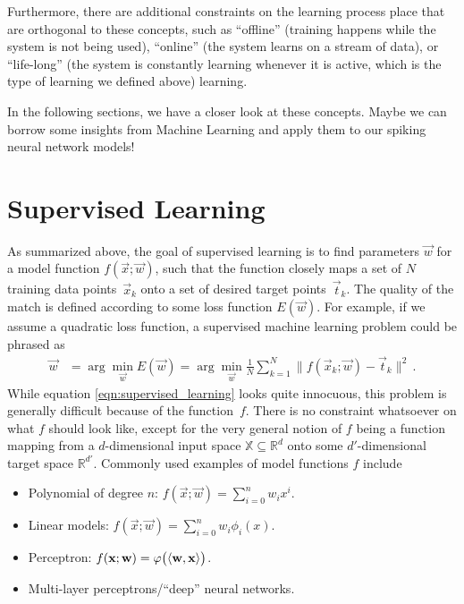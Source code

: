 \documentclass[10pt,letterpaper,oneside]{article}
\begin{document}
Furthermore, there are additional constraints on the learning process place that are orthogonal to these concepts, such as \enquote{offline} (training happens while the system is not being used), \enquote{online} (the system learns on a stream of data), or \enquote{life-long} (the system is constantly learning whenever it is active, which is the type of learning we defined above) learning.

In the following sections, we have a closer look at these concepts. Maybe we can borrow some insights from Machine Learning and apply them to our spiking neural network models!

\section{Supervised Learning}

As summarized above, the goal of supervised learning is to find parameters $\vec w$ for a model function $f(\vec x; \vec w)$, such that the function closely maps a set of $N$ training data points~$\vec x_k$ onto a set of desired target points~$\vec t_k$. The quality of the match is defined according to some loss function $E(\vec w)$. For example, if we assume a quadratic loss function, a supervised machine learning problem could be phrased as
\begin{align}
	\vec w &= \arg \min_{\vec w} E(\vec w) = \arg \min_{\vec w} \frac{1}{N} \sum_{k = 1}^N \big\| f(\vec x_k ; \vec w) - \vec t_k \big\|^2 \,.
	\label{eqn:supervised_learning}
\end{align}
While equation \cref{eqn:supervised_learning} looks quite innocuous, this problem is generally difficult because of the function~$f$. There is no constraint whatsoever on what $f$ should look like, except for the very general notion of $f$ being a function mapping from a $d$-dimensional input space $\mathbb{X} \subseteq \mathbb{R}^d$ onto some $d'$-dimensional target space $\mathbb{R}^{d'}$. Commonly used examples of model functions $f$ include
\begin{itemize}
	\item Polynomial of degree $n$: $f(\vec x; \vec w) = \sum_{i = 0}^n w_i x^i$.
	\item Linear models: $f(\vec x; \vec w) = \sum_{i = 0}^n w_i \phi_i(x)$.
	\item Perceptron: $f({\mathbf{x}}; {\mathbf{w}}) = \varphi\big(\langle {\mathbf{w}}, {\mathbf{x}} \rangle \big)$.
	\item Multi-layer perceptrons/\enquote{deep} neural networks.
\end{itemize}
\end{document}
